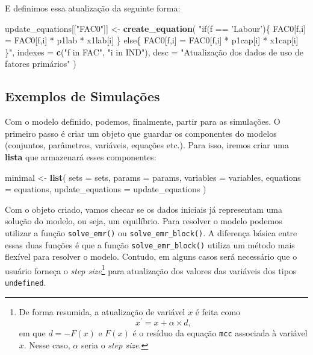 \documentclass[12pt,twoside]{article}
\newenvironment{Shaded}{\begin{snugshade}}{\end{snugshade}}
\newcommand{\DataTypeTok}[1]{\textcolor[rgb]{0.13,0.29,0.53}{#1}}
\newcommand{\KeywordTok}[1]{\textcolor[rgb]{0.13,0.29,0.53}{\textbf{#1}}}
\newcommand{\NormalTok}[1]{#1}
\newcommand{\StringTok}[1]{\textcolor[rgb]{0.31,0.60,0.02}{#1}}
\let\oldShaded\Shaded
\let\endoldShaded\endShaded
\renewenvironment{Shaded}{\footnotesize\oldShaded}{\endoldShaded}
\let\rmarkdownfootnote\footnote%
\def\footnote{\protect\rmarkdownfootnote}
\begin{document}
E definimos essa atualização da seguinte forma:

\begin{Shaded}
\begin{Highlighting}[]
\NormalTok{update_equations[[}\StringTok{"FAC0"}\NormalTok{]] <-}\StringTok{ }\KeywordTok{create_equation}\NormalTok{(}
  \StringTok{"if(f == 'Labour')\{}
\StringTok{    FAC0[f,i] = FAC0[f,i] * p1lab * x1lab[i]}
\StringTok{  \} else\{}
\StringTok{    FAC0[f,i] = FAC0[f,i] * p1cap[i] * x1cap[i]}
\StringTok{  \}"}\NormalTok{,}
  \DataTypeTok{indexes =} \KeywordTok{c}\NormalTok{(}\StringTok{"f in FAC"}\NormalTok{, }\StringTok{"i in IND"}\NormalTok{),}
  \DataTypeTok{desc =} \StringTok{"Atualização dos dados de uso de fatores primários"}
\NormalTok{)}
\end{Highlighting}
\end{Shaded}

\hypertarget{exemplos-de-simulauxe7uxf5es}{%
\subsection{Exemplos de Simulações}\label{exemplos-de-simulauxe7uxf5es}}

Com o modelo definido, podemos, finalmente, partir para as simulações. O
primeiro passo é criar um objeto que guardar os componentes do modelos
(conjuntos, parâmetros, variáveis, equações etc.). Para isso, iremos
criar uma \textbf{lista} que armazenará esses componentes:

\begin{Shaded}
\begin{Highlighting}[]
\NormalTok{minimal <-}\StringTok{ }\KeywordTok{list}\NormalTok{(}
  \DataTypeTok{sets =}\NormalTok{ sets,}
  \DataTypeTok{params =}\NormalTok{ params,}
  \DataTypeTok{variables =}\NormalTok{ variables,}
  \DataTypeTok{equations =}\NormalTok{ equations,}
  \DataTypeTok{update_equations =}\NormalTok{ update_equations}
\NormalTok{)}
\end{Highlighting}
\end{Shaded}

Com o objeto criado, vamos checar se os dados iniciais já representam
uma solução do modelo, ou seja, um equilíbrio. Para resolver o modelo
podemos utilizar a função \texttt{solve\_emr()} ou
\texttt{solve\_emr\_block()}. A diferença básica entre essas duas
funções é que a função \texttt{solve\_emr\_block()} utiliza um método
mais flexível para resolver o modelo. Contudo, em alguns casos será
necessário que o usuário forneça o \emph{step size}\footnote{De forma
  resumida, a atualização de variável \(x\) é feita como
  \[x^\prime = x + \alpha \times d,\] em que \(d = -F(x)\) e \(F(x)\) é
  o resíduo da equação \texttt{mcc} associada à variável \(x\). Nesse
  caso, \(\alpha\) seria o \emph{step size}.} para atualização dos
valores das variáveis dos tipos \texttt{undefined}.
\end{document}
